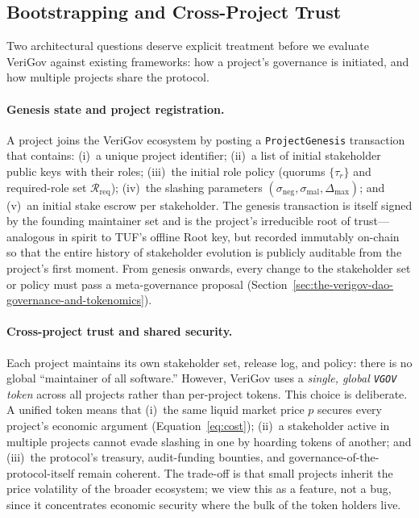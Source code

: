 \documentclass{article}
\begin{document}
\subsection{Bootstrapping and Cross-Project Trust}
\label{sec:bootstrap}

Two architectural questions deserve explicit treatment before we evaluate VeriGov against existing frameworks: how a project's governance is initiated, and how multiple projects share the protocol.

\paragraph{Genesis state and project registration.} A project joins the VeriGov ecosystem by posting a \texttt{ProjectGenesis} transaction that contains: (i)~a unique project identifier; (ii)~a list of initial stakeholder public keys with their roles; (iii)~the initial role policy (quorums $\{\tau_r\}$ and required-role set $\mathcal{R}_{\text{req}}$); (iv)~the slashing parameters $(\sigma_{\text{neg}}, \sigma_{\text{mal}}, \Delta_{\max})$; and (v)~an initial stake escrow per stakeholder. The genesis transaction is itself signed by the founding maintainer set and is the project's irreducible root of trust---analogous in spirit to TUF's offline Root key, but recorded immutably on-chain so that the entire history of stakeholder evolution is publicly auditable from the project's first moment. From genesis onwards, every change to the stakeholder set or policy must pass a meta-governance proposal (Section~\ref{sec:the-verigov-dao-governance-and-tokenomics}).

\paragraph{Cross-project trust and shared security.} Each project maintains its own stakeholder set, release log, and policy: there is no global ``maintainer of all software.'' However, VeriGov uses a \emph{single, global \texttt{VGOV} token} across all projects rather than per-project tokens. This choice is deliberate. A unified token means that (i)~the same liquid market price $p$ secures every project's economic argument (Equation~\ref{eq:cost}); (ii)~a stakeholder active in multiple projects cannot evade slashing in one by hoarding tokens of another; and (iii)~the protocol's treasury, audit-funding bounties, and governance-of-the-protocol-itself remain coherent. The trade-off is that small projects inherit the price volatility of the broader ecosystem; we view this as a feature, not a bug, since it concentrates economic security where the bulk of the token holders live.
\end{document}
